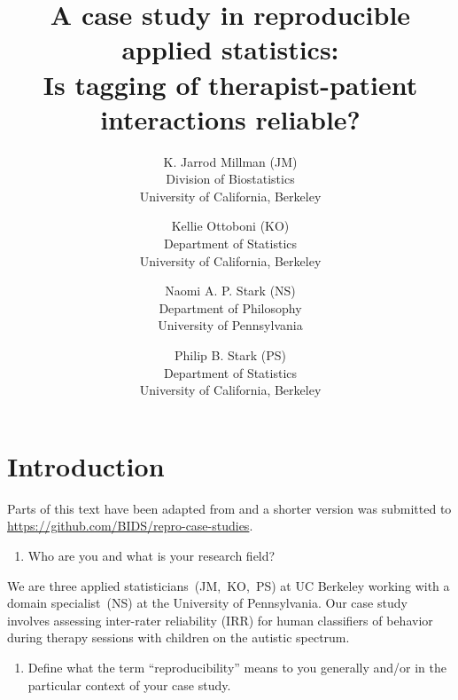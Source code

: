 \documentclass[]{article}
\date{}
\begin{document}
\title{A case study in reproducible applied statistics:\\
Is tagging of therapist-patient interactions reliable?
}

\author{K. Jarrod Millman (JM)\\ Division of Biostatistics\\ University of California, Berkeley \and
Kellie Ottoboni (KO)\\ Department of Statistics\\ University of California, Berkeley \and
Naomi A. P. Stark (NS)\\ Department of Philosophy\\ University of Pennsylvania \and
Philip B. Stark (PS)\\ Department of Statistics\\ University of California, Berkeley
}

\maketitle


\section{Introduction}

Parts of this text have been adapted from \citet{millman2015thesis} and a
shorter version was submitted to
\url{https://github.com/BIDS/repro-case-studies}.


\begin{enumerate}
\def\labelenumi{\arabic{enumi})}
\itemsep1pt\parskip0pt
\item
  Who are you and what is your research field?
\end{enumerate}

We are three applied statisticians~(JM,~KO,~PS) at UC Berkeley working with a
domain specialist~(NS) at the University of Pennsylvania.
Our case study involves assessing inter-rater reliability (IRR) for human
classifiers of behavior during therapy sessions with children on the autistic spectrum.

\begin{enumerate}
\def\labelenumi{\arabic{enumi})}
\setcounter{enumi}{1}
\itemsep1pt\parskip0pt
\item
  Define what the term ``reproducibility'' means to you generally and/or
  in the particular context of your case study.
\end{enumerate}
\end{document}
